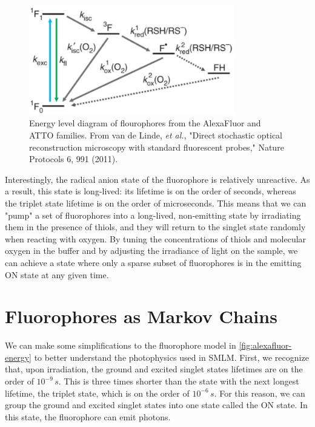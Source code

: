 \documentclass[10pt,a4paper]{book}
\begin{document}
\begin{figure}[ht]
    \centering
    \includegraphics[width=0.8\textwidth]{alexafluor-jablonski-diagram.png}
    \caption{Energy level diagram of flourophores from the AlexaFluor and ATTO families. From van de Linde, \textit{et al.}, "Direct stochastic optical reconstruction microscopy with standard fluorescent probes," Nature Protocols 6, 991 (2011).}
    \label{fig:alexafluor-energy}
\end{figure}

Interestingly, the radical anion state of the fluorophore is relatively unreactive. As a result, this state is long-lived: its lifetime is on the order of seconds, whereas the triplet state lifetime is on the order of microseconds. This means that we can "pump" a set of fluorophores into a long-lived, non-emitting state by irradiating them in the presence of thiols, and they will return to the singlet state randomly when reacting with oxygen. By tuning the concentrations of thiols and molecular oxygen in the buffer and by adjusting the irradiance of light on the sample, we can achieve a state where only a sparse subset of fluorophores is in the emitting ON state at any given time.

\section{Fluorophores as Markov Chains}

We can make some simplifications to the fluorophore model in \autoref{fig:alexafluor-energy} to better understand the photophysics used in SMLM. First, we recognize that, upon irradiation, the ground and excited singlet states lifetimes are on the order of $10^{-9} \, s$. This is three times shorter than the state with the next longest lifetime, the triplet state, which is on the order of $10^{-6} \, s$. For this reason, we can group the ground and excited singlet states into one state called the ON state. In this state, the fluorophore can emit photons.
\end{document}
